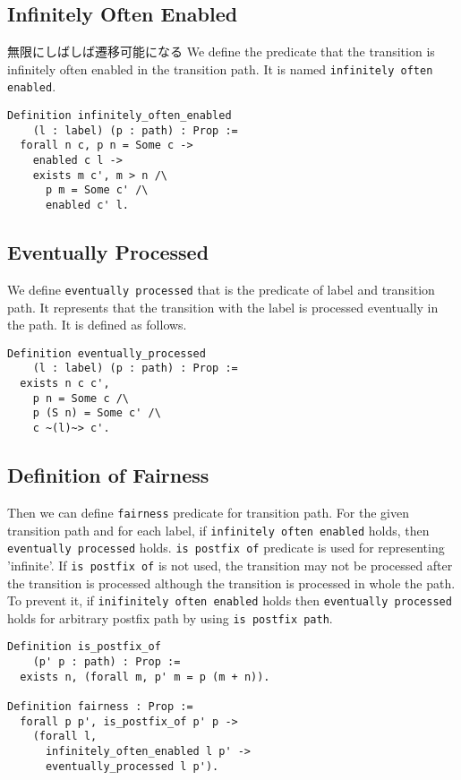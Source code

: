 \subsection{Infinitely Often Enabled}
無限にしばしば遷移可能になる
We define the predicate that the transition is infinitely often enabled in the transition path.
It is named \texttt{infinitely often enabled}.

\begin{lstlisting}
Definition infinitely_often_enabled
    (l : label) (p : path) : Prop :=
  forall n c, p n = Some c ->
    enabled c l ->
    exists m c', m > n /\
      p m = Some c' /\
      enabled c' l.
\end{lstlisting}


\subsection{Eventually Processed}
We define \texttt{eventually processed} that is the predicate of label and transition path.
It represents that the transition with the label is processed eventually in the path.
It is defined as follows.

\begin{lstlisting}
Definition eventually_processed
    (l : label) (p : path) : Prop :=
  exists n c c',
    p n = Some c /\
    p (S n) = Some c' /\
    c ~(l)~> c'.
\end{lstlisting}


\subsection{Definition of Fairness}
Then we can define \texttt{fairness} predicate for transition path.
For the given transition path and for each label, if \texttt{infinitely often enabled} holds, then \texttt{eventually processed} holds.
\texttt{is postfix of} predicate is used for representing 'infinite'.
If \texttt{is postfix of} is not used, the transition may not be processed after the transition is processed although the transition is processed in whole the path.
To prevent it, if \texttt{inifinitely often enabled} holds then \texttt{eventually processed} holds for arbitrary postfix path by using \texttt{is postfix path}.

\begin{lstlisting}
Definition is_postfix_of
    (p' p : path) : Prop :=
  exists n, (forall m, p' m = p (m + n)).

Definition fairness : Prop :=
  forall p p', is_postfix_of p' p ->
    (forall l,
      infinitely_often_enabled l p' ->
      eventually_processed l p').
\end{lstlisting}
